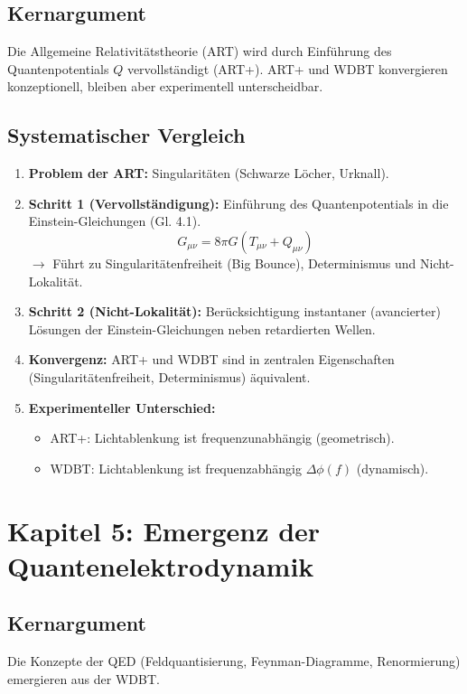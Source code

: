 \documentclass[10pt,a4paper]{article}
\begin{document}
\subsection*{Kernargument}
Die Allgemeine Relativitätstheorie (ART) wird durch Einführung des Quantenpotentials $Q$ vervollständigt (ART+). ART+ und WDBT konvergieren konzeptionell, bleiben aber experimentell unterscheidbar.

\subsection*{Systematischer Vergleich}
\begin{enumerate}
    \item \textbf{Problem der ART:} Singularitäten (Schwarze Löcher, Urknall).
    \item \textbf{Schritt 1 (Vervollständigung):} Einführung des Quantenpotentials in die Einstein-Gleichungen (Gl. 4.1).
        \[
        G_{\mu\nu} = 8\pi G (T_{\mu\nu} + Q_{\mu\nu})
        \]
        $\rightarrow$ Führt zu Singularitätenfreiheit (Big Bounce), Determinismus und Nicht-Lokalität.
    \item \textbf{Schritt 2 (Nicht-Lokalität):} Berücksichtigung instantaner (avancierter) Lösungen der Einstein-Gleichungen neben retardierten Wellen.
    \item \textbf{Konvergenz:} ART+ und WDBT sind in zentralen Eigenschaften (Singularitätenfreiheit, Determinismus) äquivalent.
    \item \textbf{Experimenteller Unterschied:}
        \begin{itemize}
            \item ART+: Lichtablenkung ist frequenzunabhängig (geometrisch).
            \item WDBT: Lichtablenkung ist frequenzabhängig $\Delta\phi(f)$ (dynamisch).
        \end{itemize}
\end{enumerate}

\section{Kapitel 5: Emergenz der Quantenelektrodynamik}

\subsection*{Kernargument}
Die Konzepte der QED (Feldquantisierung, Feynman-Diagramme, Renormierung) emergieren aus der WDBT.
\end{document}
